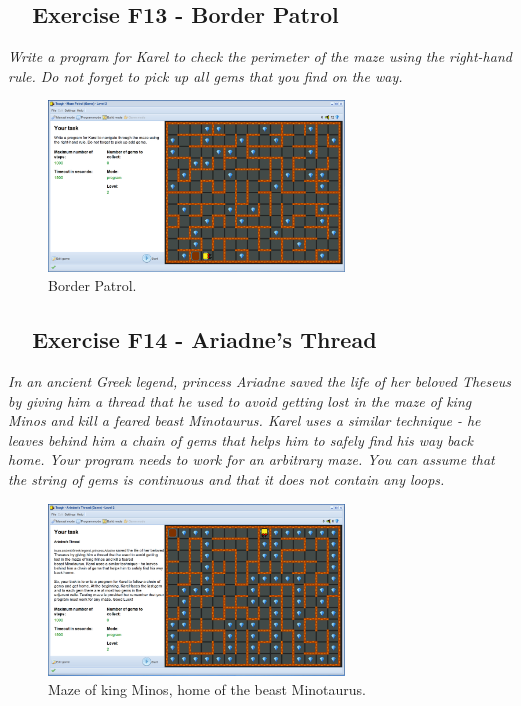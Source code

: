 \documentclass[article,A4,12pt]{llncs}
\begin{document}
\subsection{\ \ Exercise F13 - Border Patrol}

{\em Write a program for Karel to check the perimeter of the maze using the 
right-hand rule. Do not forget to pick up all gems that you find on the way.}

\begin{figure}[!ht]
\begin{center}
\includegraphics[width=0.7\textwidth]{img/g08.png}
\end{center}
\vspace{-4mm}
\caption{Border Patrol.}
\label{fig:g08}
\vspace{-10mm}
\end{figure}
\noindent

\subsection{\ \ Exercise F14 - Ariadne's Thread}

{\em In an ancient Greek legend, princess Ariadne saved the life of her 
beloved Theseus by giving him a thread that he used to avoid getting lost 
in the maze of king Minos and kill a feared beast Minotaurus. Karel uses 
a similar technique - he leaves behind him a chain of gems that helps him 
to safely find his way back home. Your program needs to work for an 
arbitrary maze. You can assume that the string of gems is continuous 
and that it does not contain any loops.}

\begin{figure}[!ht]
\begin{center}
\includegraphics[width=0.7\textwidth]{img/g09.png}
\end{center}
\vspace{-4mm}
\caption{Maze of king Minos, home of the beast Minotaurus.}
\label{fig:g09}
\end{figure}
\noindent
\end{document}
